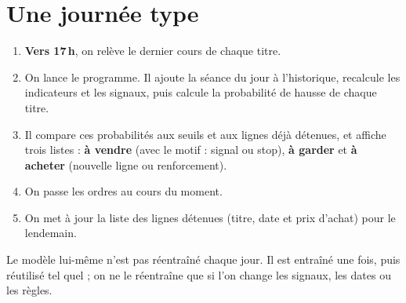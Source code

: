 \documentclass[11pt,a4paper]{article}
\begin{document}
\section{Une journée type}
\begin{enumerate}
  \item \textbf{Vers 17\,h}, on relève le dernier cours de chaque titre.
  \item On lance le programme. Il ajoute la séance du jour à l'historique, recalcule les
  indicateurs et les signaux, puis calcule la probabilité de hausse de chaque titre.
  \item Il compare ces probabilités aux seuils et aux lignes déjà détenues, et affiche trois
  listes : \textbf{à vendre} (avec le motif : signal ou stop), \textbf{à garder} et
  \textbf{à acheter} (nouvelle ligne ou renforcement).
  \item On passe les ordres au cours du moment.
  \item On met à jour la liste des lignes détenues (titre, date et prix d'achat) pour le
  lendemain.
\end{enumerate}
Le modèle lui-même n'est pas réentraîné chaque jour. Il est entraîné une fois, puis
réutilisé tel quel ; on ne le réentraîne que si l'on change les signaux, les dates ou les
règles.

\end{document}
